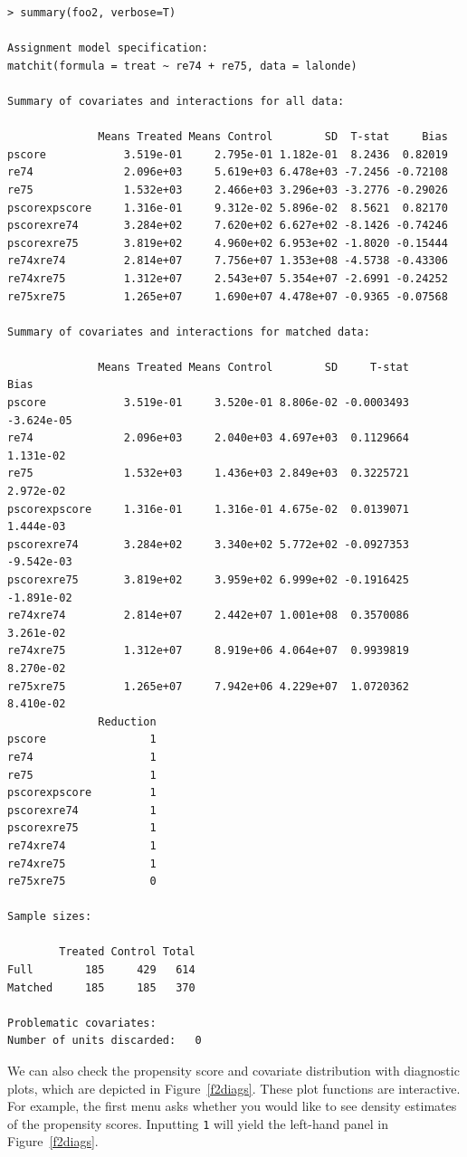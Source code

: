 \documentclass[oneside,letterpaper,titlepage]{article}
\begin{document}
\begin{verbatim}
> summary(foo2, verbose=T)
 
Assignment model specification:
matchit(formula = treat ~ re74 + re75, data = lalonde)
 
Summary of covariates and interactions for all data:
 
              Means Treated Means Control        SD  T-stat     Bias
pscore            3.519e-01     2.795e-01 1.182e-01  8.2436  0.82019
re74              2.096e+03     5.619e+03 6.478e+03 -7.2456 -0.72108
re75              1.532e+03     2.466e+03 3.296e+03 -3.2776 -0.29026
pscorexpscore     1.316e-01     9.312e-02 5.896e-02  8.5621  0.82170
pscorexre74       3.284e+02     7.620e+02 6.627e+02 -8.1426 -0.74246
pscorexre75       3.819e+02     4.960e+02 6.953e+02 -1.8020 -0.15444
re74xre74         2.814e+07     7.756e+07 1.353e+08 -4.5738 -0.43306
re74xre75         1.312e+07     2.543e+07 5.354e+07 -2.6991 -0.24252
re75xre75         1.265e+07     1.690e+07 4.478e+07 -0.9365 -0.07568
 
Summary of covariates and interactions for matched data:
 
              Means Treated Means Control        SD     T-stat       Bias
pscore            3.519e-01     3.520e-01 8.806e-02 -0.0003493 -3.624e-05
re74              2.096e+03     2.040e+03 4.697e+03  0.1129664  1.131e-02
re75              1.532e+03     1.436e+03 2.849e+03  0.3225721  2.972e-02
pscorexpscore     1.316e-01     1.316e-01 4.675e-02  0.0139071  1.444e-03
pscorexre74       3.284e+02     3.340e+02 5.772e+02 -0.0927353 -9.542e-03
pscorexre75       3.819e+02     3.959e+02 6.999e+02 -0.1916425 -1.891e-02
re74xre74         2.814e+07     2.442e+07 1.001e+08  0.3570086  3.261e-02
re74xre75         1.312e+07     8.919e+06 4.064e+07  0.9939819  8.270e-02
re75xre75         1.265e+07     7.942e+06 4.229e+07  1.0720362  8.410e-02
              Reduction
pscore                1
re74                  1
re75                  1
pscorexpscore         1
pscorexre74           1
pscorexre75           1
re74xre74             1
re74xre75             1
re75xre75             0
 
Sample sizes:
 
        Treated Control Total
Full        185     429   614
Matched     185     185   370
 
Problematic covariates:
Number of units discarded:   0
\end{verbatim}

We can also check the propensity score and covariate distribution with
diagnostic plots, which are depicted in Figure~\ref{f2diags}.  These
plot functions are interactive.  For example, the first menu asks
whether you would like to see density estimates of the propensity
scores.  Inputting \texttt{1} will yield the left-hand panel in
Figure~\ref{f2diags}.
\end{document}

